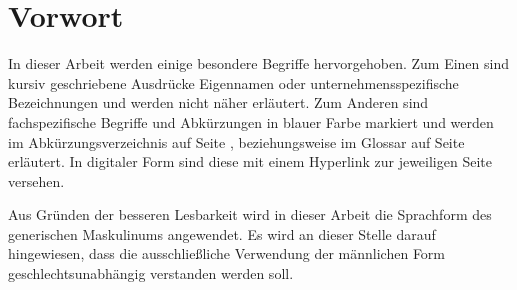 
\pagestyle{empty}

\chapter*{Vorwort}
In dieser Arbeit werden einige besondere Begriffe hervorgehoben. Zum Einen sind kursiv geschriebene Ausdrücke Eigennamen oder unternehmensspezifische Bezeichnungen und werden nicht näher erläutert. Zum Anderen sind fachspezifische Begriffe und Abkürzungen in blauer Farbe markiert und werden im Abkürzungsverzeichnis auf Seite \pageref{acronyms}, beziehungsweise im Glossar auf Seite \pageref{glossary} erläutert. In digitaler Form sind diese mit einem Hyperlink zur jeweiligen Seite versehen.

Aus  Gründen  der  besseren  Lesbarkeit  wird  in  dieser  Arbeit  die Sprachform des generischen Maskulinums  angewendet. Es wird an dieser Stelle   darauf   hingewiesen,   dass   die   ausschließliche   Verwendung   der männlichen Form geschlechtsunabhängig verstanden werden soll. 